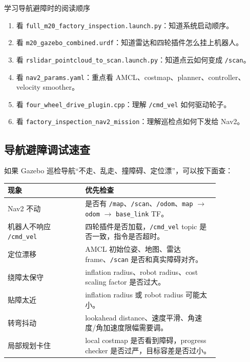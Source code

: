 \documentclass[UTF8,11pt,a4paper]{ctexart}
\begin{document}
\begin{greenbox}{学习导航避障时的阅读顺序}
\begin{enumerate}
  \item 看 \texttt{full\_m20\_factory\_inspection.launch.py}：知道系统启动顺序。
  \item 看 \texttt{m20\_gazebo\_combined.urdf}：知道雷达和四轮插件怎么挂上机器人。
  \item 看 \texttt{rslidar\_pointcloud\_to\_scan.launch.py}：知道点云如何变成 \texttt{/scan}。
  \item 看 \texttt{nav2\_params.yaml}：重点看 AMCL、costmap、planner、controller、velocity smoother。
  \item 看 \texttt{four\_wheel\_drive\_plugin.cpp}：理解 \texttt{/cmd\_vel} 如何驱动轮子。
  \item 看 \texttt{factory\_inspection\_nav2\_mission}：理解巡检点如何下发给 Nav2。
\end{enumerate}
\end{greenbox}

\subsection{导航避障调试速查}

如果 Gazebo 巡检导航“不走、乱走、撞障碍、定位漂”，可以按下面查：

\begin{center}
\renewcommand{\arraystretch}{1.25}
\begin{tabular}{p{0.30\linewidth}p{0.52\linewidth}}
\toprule
\textbf{现象} & \textbf{优先检查}\\
\midrule
Nav2 不动 & 是否有 \texttt{/map}、\texttt{/scan}、\texttt{/odom}、\texttt{map} \(\rightarrow\) \texttt{odom} \(\rightarrow\) \texttt{base\_link} TF。\\
机器人不响应 \texttt{/cmd\_vel} & 四轮插件是否加载，\texttt{/cmd\_vel} topic 是否一致，指令是否超时。\\
定位漂移 & AMCL 初始位姿、地图、雷达 frame、\texttt{/scan} 是否和真实障碍对齐。\\
绕障太保守 & inflation radius、robot radius、cost scaling factor 是否过大。\\
贴障太近 & inflation radius 或 robot radius 可能太小。\\
转弯抖动 & lookahead distance、速度平滑、角速度/角加速度限幅需要调。\\
局部规划卡住 & local costmap 是否看到障碍，progress checker 是否过严，目标容差是否过小。\\
\bottomrule
\end{tabular}
\end{center}
\end{document}
